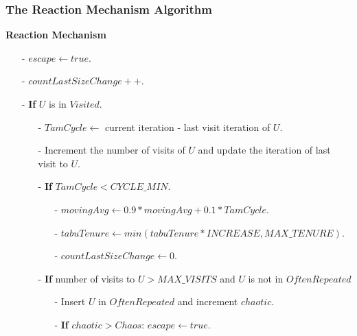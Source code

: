 \documentclass{beamer}
\begin{document}
\begin{frame}
  \frametitle{The Reaction Mechanism Algorithm}
{
{\bf Reaction Mechanism}

\begin{itemize}
\item[-] $escape \leftarrow true$. \item[-]
$countLastSizeChange++$. \item[-] \textbf{If} $U$ is in $Visited$.
    \begin{itemize}
    \item[-] $TamCycle \leftarrow$ current iteration - last visit iteration of $U$.
    \item[-] Increment the number of visits of $U$ and update the iteration of last visit to $U$.
    \item[-] \textbf{If} $TamCycle < CYCLE\_MIN$.
        \begin{itemize}
        \item[-] $movingAvg \leftarrow 0.9 * movingAvg + 0.1 * TamCycle$.
        \item[-] $tabuTenure \leftarrow min(tabuTenure * INCREASE, MAX\_TENURE)$.
        \item[-] $countLastSizeChange \leftarrow 0$.
        \end{itemize}
    \item[-] \textbf{If} number of visits to $U > MAX\_VISITS$ and $U$ is not in $OftenRepeated$
        \begin{itemize}
        \item[-] Insert $U$ in $OftenRepeated$ and increment $chaotic$.
        \item[-] \textbf{If} $chaotic > Chaos$: $escape \leftarrow true$.
        \end{itemize}
    \end{itemize}
\end{itemize}

}

\end{frame}
\end{document}
